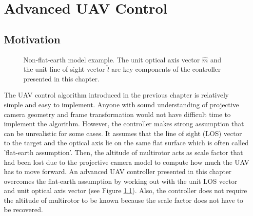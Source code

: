 \chapter{Advanced UAV Control}
\section{Motivation}
\begin{figure}[thpb]
	\centering
	\caption{Non-flat-earth model example. The unit optical axis vector $\hat{m}$ and the unit line of sight vector $\hat{l}$ are key components of the controller presented in this chapter.}
	\label{nonflatearth}
\end{figure}
The UAV control algorithm introduced in the previous chapter is relatively simple and easy to implement. Anyone with sound understanding of projective camera geometry and frame transformation would not have difficult time to implement the algorithm. However, the controller makes strong assumption that can be unrealistic for some cases. It assumes that the line of sight (LOS) vector to the target and the optical axis lie on the same flat surface which is often called 'flat-earth assumption'. Then, the altitude of multirotor acts as scale factor that had been lost due to the projective camera model to compute how much the UAV has to move forward. An advanced UAV controller presented in this chapter overcomes the flat-earth assumption by working out with the unit LOS vector and unit optical axis vector (see Figure \ref{nonflatearth}). Also, the controller does not require the altitude of multirotor to be known because the scale factor does not have to be recovered.

